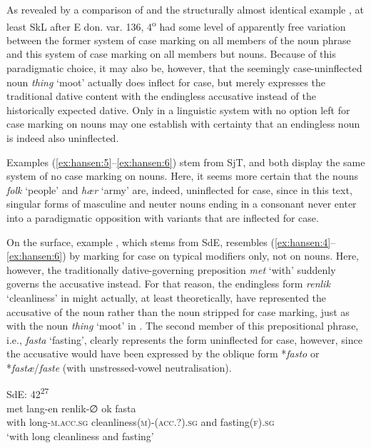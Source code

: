 \documentclass[output=paper]{langsci/langscibook}
\begin{document}
As revealed by a comparison of  and the structurally almost identical example , at least SkL after E don. var. 136, 4\textsuperscript{o} had some level of apparently free variation between the former system of case marking on all members of the noun phrase and this system of case marking on all members but nouns. Because of this paradigmatic choice, it may also be, however, that the seemingly case-uninflected noun \textit{thing} ‘moot’ actually does inflect for case, but merely expresses the traditional dative content with the endingless accusative instead of the historically expected dative. Only in a linguistic system with no option left for case marking on nouns may one establish with certainty that an endingless noun is indeed also uninflected.

Examples (\ref{ex:hansen:5}--\ref{ex:hansen:6}) stem from SjT, and both display the same system of no case marking on nouns. Here, it seems more certain that the nouns \textit{folk} ‘people’ and \textit{hær} ‘army’ are, indeed, uninflected for case, since in this text, singular forms of masculine and neuter nouns ending in a consonant never enter into a paradigmatic opposition with variants that are inflected for case.

On the surface, example , which stems from SdE, resembles (\ref{ex:hansen:4}--\ref{ex:hansen:6}) by marking for case on typical modifiers only, not on nouns. Here, however, the traditionally dative-governing preposition \textit{met} ‘with’ suddenly governs the accusative instead. For that reason, the endingless form \textit{renlik} ‘cleanliness’ in  might actually, at least theoretically, have represented the accusative of the noun rather than the noun stripped for case marking, just as with the noun \textit{thing} ‘moot’ in . The second member of this prepositional phrase, i.e., \textit{fasta} ‘fasting’, clearly represents the form uninflected for case, however, since the accusative would have been expressed by the oblique form *\textit{fasto} or *\textit{fastæ}/\textit{faste} (with unstressed-vowel neutralisation).

\ea \label{ex:hansen:7}
{SdE: 42\textsuperscript{27}} \\ 
\gll met lang-en renlik-∅ ok fasta\\
     with long\textsc{{}-}\textsc{m.acc.sg} cleanliness\textsc{(m)-(acc.?).sg} and fasting\textsc{(f).sg}\\
\glt ‘with long cleanliness and fasting’
\z
\end{document}
